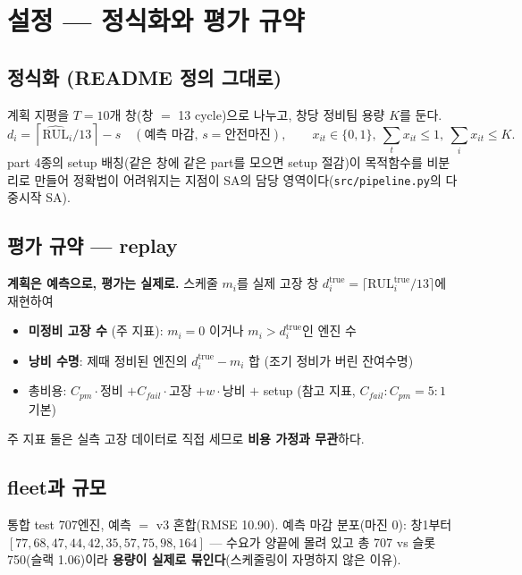 \documentclass[11pt]{article}
\begin{document}
\tableofcontents
\newpage

\section{설정 — 정식화와 평가 규약}

\subsection{정식화 (README  정의 그대로)}

계획 지평을 $T{=}10$개 창(창 $=$ 13 cycle)으로 나누고, 창당 정비팀 용량 $K$를 둔다.
\[
d_i = \left\lceil \widehat{\mathrm{RUL}}_i / 13 \right\rceil - s
\quad(\text{예측 마감, } s{=}\text{안전마진}),\qquad
x_{it}\in\{0,1\},\ \textstyle\sum_t x_{it}\le 1,\ \sum_i x_{it}\le K.
\]
part 4종의 setup 배칭(같은 창에 같은 part를 모으면 setup 절감)이 목적함수를 비분리로 만들어
정확법이 어려워지는 지점이 SA의 담당 영역이다(\texttt{src/pipeline.py}의 다중시작 SA).

\subsection{평가 규약 — replay}

\textbf{계획은 예측으로, 평가는 실제로.}
스케줄 $m_i$를 실제 고장 창 $d^{\text{true}}_i = \lceil \mathrm{RUL}^{\text{true}}_i/13 \rceil$에 재현하여
\begin{itemize}[nosep]
  \item \textbf{미정비 고장 수} (주 지표): $m_i{=}0$ 이거나 $m_i > d^{\text{true}}_i$인 엔진 수
  \item \textbf{낭비 수명}: 제때 정비된 엔진의 $d^{\text{true}}_i - m_i$ 합 (조기 정비가 버린 잔여수명)
  \item 총비용: $C_{pm}{\cdot}$정비 $+ C_{fail}{\cdot}$고장 $+ w{\cdot}$낭비 $+$ setup (참고 지표, $C_{fail}{:}C_{pm}=5{:}1$ 기본)
\end{itemize}
주 지표 둘은 실측 고장 데이터로 직접 세므로 \textbf{비용 가정과 무관}하다.

\subsection{fleet과 규모}

통합 test 707엔진, 예측 $=$ v3 혼합(RMSE 10.90).
예측 마감 분포(마진 0): 창1부터 $[77, 68, 47, 44, 42, 35, 57, 75, 98, 164]$ —
수요가 양끝에 몰려 있고 총 707 vs 슬롯 750(슬랙 1.06)이라 \textbf{용량이 실제로 묶인다}(스케줄링이 자명하지 않은 이유).
\end{document}
